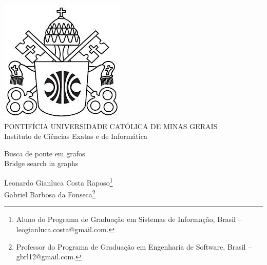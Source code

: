 \documentclass[a4paper,12pt,Times]{article}
\makeatletter
\newcommand{\monog}{Busca de ponte em grafos}
\newcommand{\monogES}{Bridge search in graphs}
\newcommand{\origem}{Brasil }
\newcommand{\AutorA}{Leonardo Gianluca Costa Raposo}
\newcommand{\funcaoA}{}
\newcommand{\emailA}{leogianluca.costa@gmail.com}
\newcommand{\cursA}{Aluno do Programa de Graduação em Sistemas de Informação}
\newcommand{\AutorB}{Gabriel Barbosa da Fonseca}
\newcommand{\funcaoB}{}
\newcommand{\emailB}{gbrl12@gmail.com}
\newcommand{\cursB}{Professor do Programa de Graduação em Engenharia de Software}
\newcommand{\keyword}[1]{\textsf{#1}}
\makeatother
\begin{document}

\begin{center}
\includegraphics[scale=0.2]{figuras/brasao.jpg} \\
PONTIFÍCIA UNIVERSIDADE CATÓLICA DE MINAS GERAIS \\
Instituto de Ciências Exatas e de Informática


\end{center}

 \vspace{0cm} {
 \singlespacing \Large{\monog {} \\ }
  \normalsize{\monogES}
 }

\vspace{1.0cm}

\begin{flushright}
\singlespacing 
\normalsize{\AutorA \footnote{\funcaoA \cursA, \origem -- \emailA . }} \\
\normalsize{\AutorB \footnote{\funcaoB \cursB, \origem -- \emailB . }} \\
\end{flushright}
\thispagestyle{empty}

\vspace{1.0cm}

\begin{abstract}
\noindent
O presente estudo tem como objetivo apresentar o que são grafos e quais são as funcionalidades de seus algoritmos. Ainda, é demonstrado um estudo mais profundo em relação a busca de pontes utilizando de dois métodos para a identificação das pontes em um determinado grafo criado com X vértices, no qual foi testado um Caminho Euleriano com a utilização do Algoritmo de Fleury para a representação dos tempos computacionais usados como teste dos algoritmos implementados. Assim sendo, foi construída uma biblioteca por meio da linguagem de programação Python, na qual é lido um arquivo .CSV com base nas representações de Matriz de Adjacência e Lista de Adjacência, realizando operações em suas entradas de dados. Quanto a saída, é exportado um arquivo que, por sua vez, pode ser lido pelo software de visualização de grafos Gephi.
\\\textbf{\keyword{Palavras-chave: }} Grafos. Algoritmo. Python. Ponte.
\end{abstract}
\end{document}
